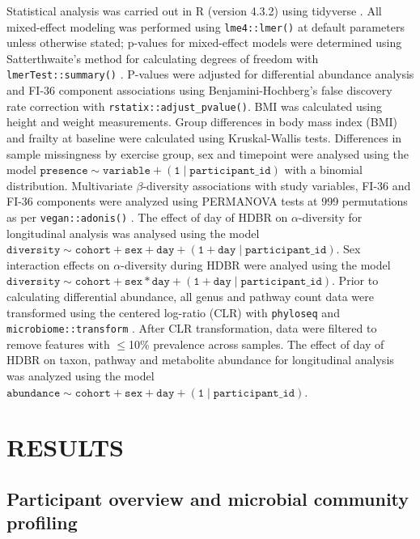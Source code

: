 \documentclass[preprint,12pt,authoryear]{elsarticle}
\begin{document}
    Statistical analysis was carried out in R (version 4.3.2) using tidyverse \citep{wickhamWelcomeTidyverse2019}. All mixed-effect modeling was performed using \texttt{lme4::lmer()} \citep{batesFittingLinearMixedEffects2015} at default parameters unless otherwise stated; p-values for mixed-effect models were determined using Satterthwaite’s method \citep{giesbrechtTwoStageAnalysisBased1985, hrong-taifaiApproximateFtestsMultiple1996} for calculating degrees of freedom with \texttt{lmerTest::summary()} \citep{kuznetsovaLmerTestPackageTests2017}. P-values were adjusted for differential abundance analysis and FI-36 component associations using Benjamini-Hochberg's false discovery rate correction with \texttt{rstatix::adjust\_pvalue()}. BMI was calculated using height and weight measurements. Group differences in body mass index (BMI) and frailty at baseline were calculated using Kruskal-Wallis tests. Differences in sample missingness by exercise group, sex and timepoint were analysed using the model $\mathtt{presence \sim variable + (1 \mid participant\_id)}$ with a binomial distribution. Multivariate $\beta$-diversity associations with study variables, FI-36 and FI-36 components were analyzed using PERMANOVA tests at 999 permutations as per \texttt{vegan::adonis()} \citep{dixonVEGANPackageFunctions2003}. The effect of day of HDBR on $\alpha$-diversity for longitudinal analysis was analysed using the model $\mathtt{diversity \sim cohort + sex + day + (1 + day \mid participant\_id)}$. Sex interaction effects on $\alpha$-diversity during HDBR were analyed using the model $\mathtt{diversity \sim cohort + sex * day + (1 + day \mid participant\_id)}$. Prior to calculating differential abundance, all genus and pathway count data were transformed using the centered log-ratio (CLR) \citep{aitchisonStatisticalAnalysisCompositional1982} with \texttt{phyloseq} \citep{mcmurdiePhyloseqPackageReproducible2013} and \texttt{microbiome::transform} \citep{leolahti[autMicrobiome2017}. After CLR transformation, data were filtered to remove features with $\leq$10\% prevalence across samples.  The effect of day of HDBR on taxon, pathway and metabolite abundance for longitudinal analysis was analyzed using the model $\mathtt{abundance \sim cohort + sex + day + (1 \mid participant\_id)}$. 

\section{RESULTS}

\subsection{Participant overview and microbial community profiling}
    
\end{document}
